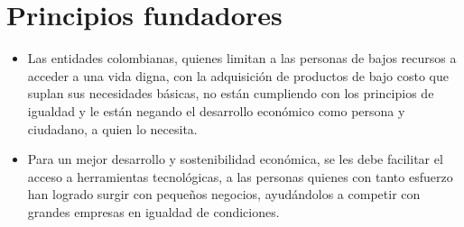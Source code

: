 \section{Principios fundadores}

\begin{itemize}
	
	\item Las entidades colombianas, quienes limitan a las personas de bajos recursos a acceder a una vida digna, con la adquisición de productos de bajo costo que suplan sus necesidades básicas, no están cumpliendo con los principios de igualdad y le están negando el desarrollo económico como persona y ciudadano, a quien lo necesita.
	
	\item Para un mejor desarrollo y sostenibilidad económica, se les debe facilitar el acceso a herramientas tecnológicas, a las personas quienes con tanto esfuerzo han logrado surgir con pequeños negocios, ayudándolos a competir con grandes empresas en igualdad de condiciones.
	
\end{itemize}